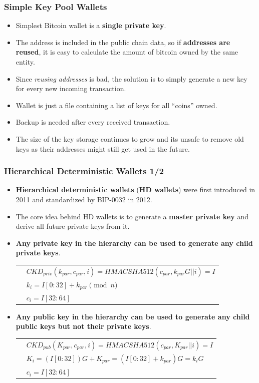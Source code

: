 \documentclass{beamer}
\begin{document}
\begin{frame}
  \frametitle{Simple Key Pool Wallets}
  \begin{itemize}
  \item Simplest Bitcoin wallet is a \textbf{single private key}.
  \item The address is included in the public chain data, so if
    \textbf{addresses are reused}, it is easy to calculate the amount of bitcoin
    owned by the same entity.
  \item Since \textit{reusing addresses} is bad, the solution is to simply
    generate a new key for every new incoming transaction.
  \item Wallet is just a file containing a list of keys for all ``coins'' owned.
  \item Backup is needed after every received transaction.
  \item The size of the key storage continues to grow and its unsafe to remove
    old keys as their addresses might still get used in the future.
  \end{itemize}
\end{frame}

\begin{frame}[fragile]
  \frametitle{Hierarchical Deterministic Wallets 1/2}
  \begin{itemize}
  \item \textbf{Hierarchical deterministic wallets} (\textbf{HD wallets}) were
    first introduced in 2011 and standardized by BIP-0032 in 2012.
  \item The core idea behind HD wallets is to generate a \textbf{master private
      key} and derive all future private keys from it.
  \item \textbf{Any private key in the hierarchy can be used to generate any child
      private keys}.
    \begin{tabular}{rl}
      &${\scriptstyle \mathit{CKD_{priv}}(k_{par}, c_{par}, i) = \mathit{HMACSHA512}(c_{par},
        k_{par}G||i) = I}$ \\
      &${\scriptstyle k_i = I[0:32] + k_{par} \pmod{n}}$ \\
      &${\scriptstyle c_i = I[32:64]}$ \\
    \end{tabular}
  \item \textbf{Any public key in the hierarchy can be used to generate any
      child public keys but not their private keys}.
    \begin{tabular}{rl}
      &${\scriptstyle \mathit{CKD_{pub}}(K_{par}, c_{par}, i) = \mathit{HMACSHA512}(c_{par},
        K_{par}||i) = I}$ \\
      &${\scriptstyle K_i = (I[0:32])G + K_{par} = (I[0:32] + k_{par})G = k_iG}$ \\
      &${\scriptstyle c_i = I[32:64]}$ \\
    \end{tabular}

  \end{itemize}
\end{frame}
\end{document}
